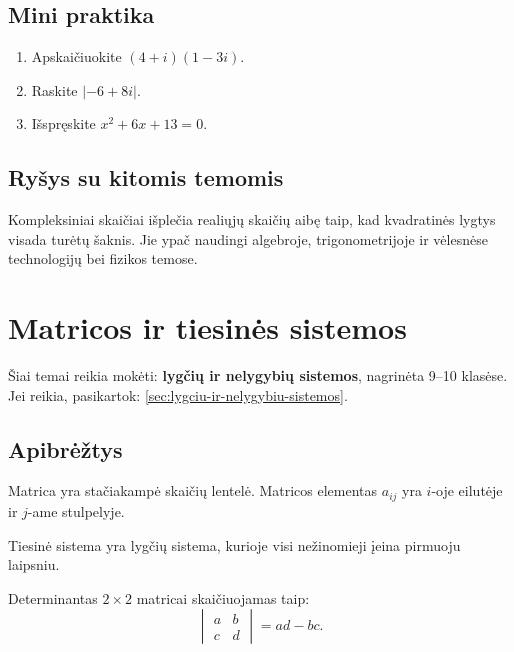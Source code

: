 \subsection{Mini praktika}
\begin{enumerate}[label=\alph*)]
\item Apskaičiuokite \((4+i)(1-3i)\).
\item Raskite \(|-6+8i|\).
\item Išspręskite \(x^2+6x+13=0\).
\end{enumerate}

\subsection{Ryšys su kitomis temomis}
Kompleksiniai skaičiai išplečia realiųjų skaičių aibę taip, kad kvadratinės lygtys visada turėtų šaknis. Jie ypač naudingi algebroje, trigonometrijoje ir vėlesnėse technologijų bei fizikos temose.

\section{Matricos ir tiesinės sistemos}\label{sec:matricos-ir-tiesines-sistemos}

\begin{tcolorbox}[title=Primename iš ankstesnių klasių, colback=yellow!10]
Šiai temai reikia mokėti: \textbf{lygčių ir nelygybių sistemos}, nagrinėta 9--10 klasėse.
Jei reikia, pasikartok: \ref{sec:lygciu-ir-nelygybiu-sistemos}.
\end{tcolorbox}

\subsection{Apibrėžtys}
\begin{apibreztis}
Matrica yra stačiakampė skaičių lentelė. Matricos elementas \(a_{ij}\) yra \(i\)-oje eilutėje ir \(j\)-ame stulpelyje.
\end{apibreztis}
\begin{apibreztis}
Tiesinė sistema yra lygčių sistema, kurioje visi nežinomieji įeina pirmuoju laipsniu.
\end{apibreztis}
\begin{apibreztis}
Determinantas \(2\times2\) matricai skaičiuojamas taip:
\[
\begin{vmatrix}a&b\\c&d\end{vmatrix}=ad-bc.
\]
\end{apibreztis}

